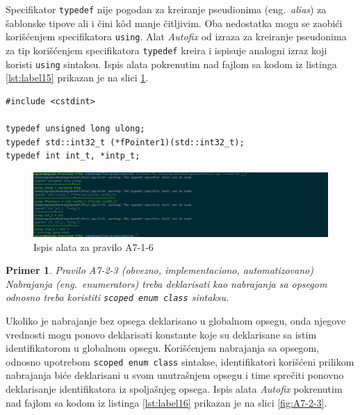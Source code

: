 \documentclass[12pt,oneside]{memoir}
\newtheorem{primer}{Primer}[section]
\begin{document}
Specifikator \texttt{typedef} nije pogodan za kreiranje pseudionima (eng.~\textit{alias}) za \v{s}ablonske tipove ali i \v{c}ini k\^{o}d manje \v{c}itljivim.
Oba nedostatka mogu se zaobi\'{c}i kori\v{s}\'{c}enjem specifikatora \texttt{using}. Alat \textit{Autofix} od izraza za kreiranje pseudonima za tip kori\v{s}\'{c}enjem
specifikatora \texttt{typedef} kreira i ispisuje analogni izraz koji koristi \texttt{using} sintaksu. Ispis alata pokrenutim nad fajlom sa kodom iz listinga \ref{lst:label15} prikazan je na slici \ref{fig:A7-1-6}. \\

\begin{lstlisting}[style=customc, caption={Primer koda koji nije napisan u skladu sa pravilom A7-1-6.}, label=lst:label15]
#include <cstdint>

typedef unsigned long ulong;
typedef std::int32_t (*fPointer1)(std::int32_t);
typedef int int_t, *intp_t;

\end{lstlisting}

\begin{figure}[!h]
\begin{center}
\includegraphics[scale=0.3]{A7-1-6.png}
\end{center}
\caption{Ispis alata za pravilo A7-1-6}
\label{fig:A7-1-6}
\end{figure}


\begin{primer}
Pravilo A7-2-3 (obvezno, implementaciono, automatizovano) \\
Nabrajanja (eng.~\textit{enumerators}) treba deklarisati kao nabrajanja sa opsegom odnosno treba koristiti \texttt{scoped enum class} sintaksu.
\end{primer}

Ukoliko je nabrajanje bez opsega deklarisano u globalnom opsegu, onda njegove vrednosti mogu ponovo deklarisati konstante koje su deklarisane sa istim identifikatorom u globalnom opsegu. Kori\v{s}\'{c}enjem nabrajanja sa opsegom, odnosno upotrebom \texttt{scoped enum class} sintakse, identifikatori kori\v{s}\'{c}eni prilikom
nabrajanja bi\'{c}e deklarisani u svom unutra\v{s}njem opsegu i time spre\v{c}iti ponovno deklarisanje identifikatora iz spolja\v{s}njeg opsega. 
Ispis alata \textit{Autofix} pokrenutim nad fajlom sa kodom iz listinga \ref{lst:label16} prikazan je na slici \ref{fig:A7-2-3}. \\
\end{document}
